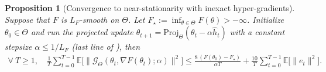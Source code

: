 \documentclass[10pt,a4paper]{amsart}
\newtheorem{proposition}{Proposition}
\begin{document}
\begin{proposition}[Convergence to near-stationarity with inexact hyper-gradients]\label{prop:outer-inexact}
Suppose that $F$ is $L_F$-smooth on $\Theta$.
Let $F_\star:=\inf_{\theta\in\Theta}F(\theta)>-\infty$.
Initialize $\theta_0\in\Theta$ and run the projected update
$\theta_{t+1}=\mathrm{Proj}_{\Theta}(\theta_t-\alpha \widehat h_t)$ with a constant
stepsize $\alpha\le 1/L_F$ (last line of ), then
\begin{align}
\forall\ T \geq 1, \quad \frac{1}{T}\sum_{t=0}^{T-1}\mathbb E\big[\|\mathcal G_{\Theta}(\theta_t,\nabla F(\theta_t);\alpha)\|^2\big]\le
\frac{8\,(F(\theta_0)-F_\star)}{\alpha T}+ \frac{10}{T}\sum_{t=0}^{T-1}\mathbb E\big[\|e_t\|^2\big].
\label{eq:outer-inexact}
\end{align}
\end{proposition}
\end{document}
